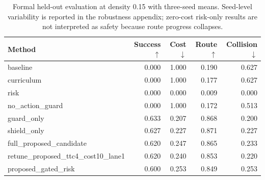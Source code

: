 \begin{table}[t]
\centering
\small
\begin{tabular}{lrrrr}
\toprule
Method & Success $\uparrow$ & Cost $\downarrow$ & Route $\uparrow$ & Collision $\downarrow$ \\
\midrule
baseline & 0.000 & 1.000 & 0.190 & 0.627 \\
curriculum & 0.000 & 1.000 & 0.177 & 0.627 \\
risk & 0.000 & 0.000 & 0.009 & 0.000 \\
no\_action\_guard & 0.000 & 1.000 & 0.172 & 0.513 \\
guard\_only & 0.633 & 0.207 & 0.868 & 0.200 \\
shield\_only & 0.627 & 0.227 & 0.871 & 0.227 \\
full\_proposed\_candidate & 0.620 & 0.247 & 0.865 & 0.233 \\
retune\_proposed\_ttc4\_cost10\_lane1 & 0.620 & 0.240 & 0.853 & 0.220 \\
proposed\_gated\_risk & 0.600 & 0.253 & 0.849 & 0.253 \\
\bottomrule
\end{tabular}
\caption{Formal held-out evaluation at density 0.15 with three-seed means. Seed-level variability is reported in the robustness appendix; zero-cost risk-only results are not interpreted as safety because route progress collapses.}
\label{tab:formal-main-d015}
\end{table}
